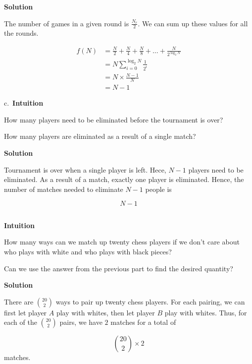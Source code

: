 \documentclass[]{book}
\begin{document}
 \textbf{Solution}

The number of games in a given round is \(\frac{N_{r}}{2}\). We can sum
up these values for all the rounds.

\begin{equation} 
  \begin{split}
   f(N) & = \frac{N}{2} + \frac{N}{4}  + \frac{N}{8} + \dots + \frac{N}{2^{\log_{2}{N}}}\\
   & =N \sum_{i=0}^{\log_{2}{N}} \frac{1}{2^{i}}\\
   & =N \times \frac{N-1}{N}\\
   & =N-1
  \end{split}
  \end{equation}

c.~\textbf{Intuition}

How many players need to be eliminated before the tournament is over?

How many players are eliminated as a result of a single match?

 \textbf{Solution}

Tournament is over when a single player is left. Hece, \(N-1\) players
need to be eliminated. As a result of a match, exactly one player is
eliminated. Hence, the number of matches needed to eliminate \(N-1\)
people is

\[ N-1 \]

\subsection{}\label{section-5}

\textbf{Intuition}

How many ways can we match up twenty chess players if we don't care
about who plays with white and who plays with black pieces?

Can we use the answer from the previous part to find the desired
quantity?

 \textbf{Solution}

There are \({20 \choose 2}\) ways to pair up twenty chess players. For
each pairing, we can first let player \(A\) play with whites, then let
player \(B\) play with whites. Thus, for each of the \({20 \choose 2}\)
pairs, we have \(2\) matches for a total of

\[ {20 \choose 2} \times 2 \] matches.

\subsection{}\label{section-6}
\end{document}
